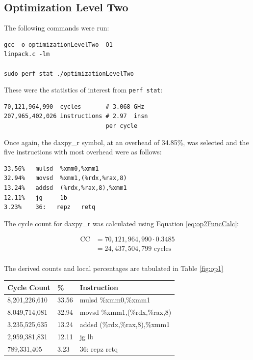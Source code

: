 \documentclass[twocolumn]{article}
\newcommand{\cc}[1]{\texttt{#1}}
\begin{document}
\subsection{Optimization Level Two}

The following commands were run: 
\begin{verbatim}
gcc -o optimizationLevelTwo -O1 
linpack.c -lm

sudo perf stat ./optimizationLevelTwo
\end{verbatim}

These were the statistics of interest from \cc{perf stat}:

\begin{verbatim}
70,121,964,990  cycles       # 3.068 GHz                    
207,965,402,026 instructions # 2.97  insn 
                             per cycle    
\end{verbatim}


Once again, the daxpy\_r symbol, at an overhead of 34.85\%, was selected and the five instructions with most overhead were as follows: 

\begin{verbatim}
33.56%   mulsd  %xmm0,%xmm1
32.94%   movsd  %xmm1,(%rdx,%rax,8)
13.24%   addsd  (%rdx,%rax,8),%xmm1
12.11%   jg     1b
3.23%    36:   repz   retq
\end{verbatim}

The cycle count for daxpy\_r was calculated using Equation \ref{eq:op2FuncCalc}: 

\begin{equation}
    \begin{split}
        \text{CC} & = 70,121,964,990 \cdot 0.3485  \\ 
        & = 24,437,504,799 \text{ cycles}\\
    \end{split}
    \label{eq:op2FuncCalc}
\end{equation}

The derived counts and local percentages are tabulated in Table \ref{fig:op1}\\

\begingroup
    \medskip
    \centering
    \def\arraystretch{1.5}
        \scriptsize{
        \begin{tabular}{lll}
            \toprule
            Cycle Count & \% & Instruction\\
            \midrule
            8,201,226,610 & 33.56 & mulsd  \%xmm0,\%xmm1 \\
            8,049,714,081 & 32.94 & movsd   \%xmm1,(\%rdx,\%rax,8) \\
            3,235,525,635 & 13.24 & addsd  (\%rdx,\%rax,8),\%xmm1 \\
            2,959,381,831 & 12.11 & jg lb \\
            789,331,405 & 3.23 & 36:   repz   retq \\
            \bottomrule
        \end{tabular}
        }
    \label{fig:op1}
    \medskip
\endgroup
\end{document}
